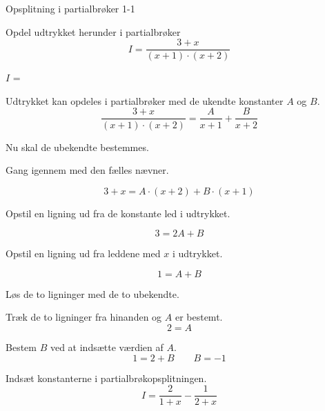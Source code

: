 \documentclass{article}
\begin{document}
\tableofcontents

\begin{exercise}{Opsplitning i partialbrøker 1-1}

Opdel udtrykket herunder i partialbrøker
\[
I = \frac{3 + x}{(x + 1) \cdot (x + 2)}
\]

$I$ =  

\hint
Udtrykket kan opdeles i partialbrøker med de ukendte konstanter $A$ og $B$.
\[
\frac{3 + x}{(x + 1) \cdot (x + 2)} = 
\frac{A}{x + 1} + \frac{B}{x + 2}
\]

\hint
Nu skal de ubekendte bestemmes.

\hint
Gang igennem med den fælles nævner.

\hint
\[
3 + x = A \cdot (x + 2) + B \cdot (x + 1)
\]

\hint
Opstil en ligning ud fra de konstante led i udtrykket.

\hint
\[
3 = 2A+B
\]

\hint
Opstil en ligning ud fra leddene med $x$ i udtrykket.

\hint
\[
1 = A + B
\]

\hint
Løs de to ligninger med de to ubekendte.

\hint
Træk de to ligninger fra hinanden og $A$ er bestemt.
\[
2 = A
\]

\hint
Bestem $B$ ved at indsætte værdien af $A$.
\[
1 = 2 + B \qquad B = -1
\]

\hint
Indsæt konstanterne i partialbrøkopsplitningen.
\[
I = \frac{2}{1 + x} - \frac{1}{2+x}
\]



\end{exercise}
\end{document}

